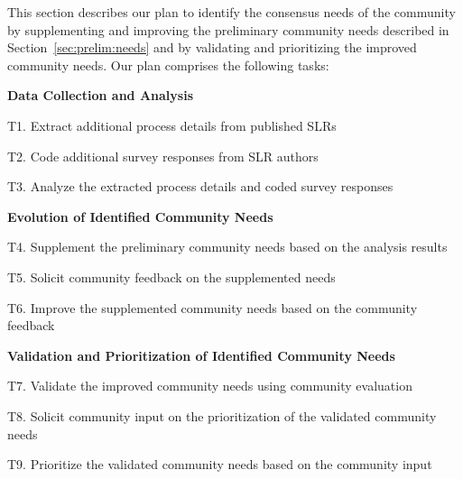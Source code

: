 
\vspace*{-4.5pt}
This section describes our plan to identify the consensus needs of the community
by supplementing and improving the preliminary community needs described in Section~\ref{sec:prelim:needs}
and by validating and prioritizing the improved community needs.
Our plan comprises the following tasks:
\begin{itemize*}
\setlength\itemindent{-1.15em}
\vspace*{-4.5pt}
\item[] \textbf{Data Collection and Analysis}
   \begin{enumerate*}
   \setlength\itemindent{-1.4em}
   \vspace*{-3pt}
   \item[T1.] Extract additional process details from published SLRs
   \item[T2.] Code additional survey responses from SLR authors
   \item[T3.] Analyze the extracted process details and coded survey responses
   \end{enumerate*}
\vspace*{-3pt}
\item[] \textbf{Evolution of Identified Community Needs}
   \begin{enumerate*}
   \setlength\itemindent{-1.4em}
   \vspace*{-3pt}
   \item[T4.] Supplement the preliminary community needs based on the analysis results
   \item[T5.] Solicit community feedback on the supplemented needs
   \item[T6.] Improve the supplemented community needs based on the community feedback
   \end{enumerate*}
\vspace*{-3pt}
\item[] \textbf{Validation and Prioritization of Identified Community Needs}
   \begin{enumerate*}
   \setlength\itemindent{-1.4em}
   \vspace*{-3pt}
   \item[T7.] Validate the improved community needs  using community evaluation
   \item[T8.] Solicit community input on the prioritization of the validated community needs 
   \item[T9.] Prioritize the validated community needs based on the community input
   \end{enumerate*}
   \vspace*{-9pt}
\end{itemize*}

